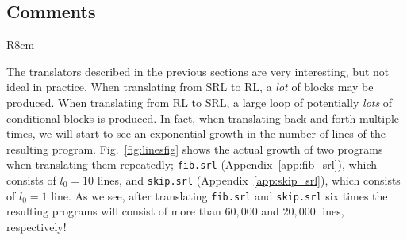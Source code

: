\pgfplotsset{compat = 1.3}
\subsection{Comments}
\begin{wrapfigure}[19]{R}{8cm}
\caption{Program size after translation. }\label{fig:linesfig}%
\end{wrapfigure}
The translators described in the previous sections are very interesting, but not ideal in practice. When translating from SRL to RL, a \textit{lot} of blocks may be produced. When translating from RL to SRL, a large loop of potentially \textit{lots} of conditional blocks is produced. In fact, when translating back and forth multiple times, we will start to see an exponential growth in the number of lines of the resulting program. Fig.~\ref{fig:linesfig} shows the actual growth of two programs when translating them repeatedly; \texttt{fib.srl} (Appendix~\ref{app:fib_srl}), which consists of $l_0=10$ lines, and \texttt{skip.srl} (Appendix~\ref{app:skip_srl}), which consists of $l_0=1$ line. As we see, after translating \texttt{fib.srl} and \texttt{skip.srl} six times the resulting programs will consist of more than $60,000$ and $20,000$ lines, respectively! %
